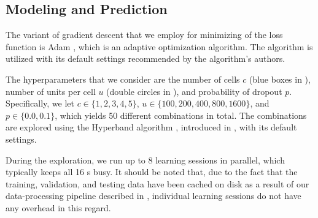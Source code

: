 \subsection{Modeling and Prediction}
The variant of gradient descent that we employ for minimizing of the loss
function is Adam \cite{kingma2014}, which is an adaptive optimization algorithm.
The algorithm is utilized with its default settings recommended by the
algorithm's authors.

The hyperparameters that we consider are the number of cells $c$ (blue boxes in
), number of units per cell $u$ (double circles in ),
and probability of dropout $p$. Specifically, we let $c \in \{1, 2, 3, 4, 5\}$,
$u \in \{100, 200, 400, 800, 1600\}$, and $p \in \{0.0, 0.1\}$, which yields 50
different combinations in total. The combinations are explored using the
Hyperband algorithm \cite{li2016}, introduced in , with its
default settings.

During the exploration, we run up to 8 learning sessions in parallel, which
typically keeps all 16 s busy. It should be noted that, due to the fact
that the training, validation, and testing data have been cached on disk as a
result of our data-processing pipeline described in , individual
learning sessions do not have any overhead in this regard.
